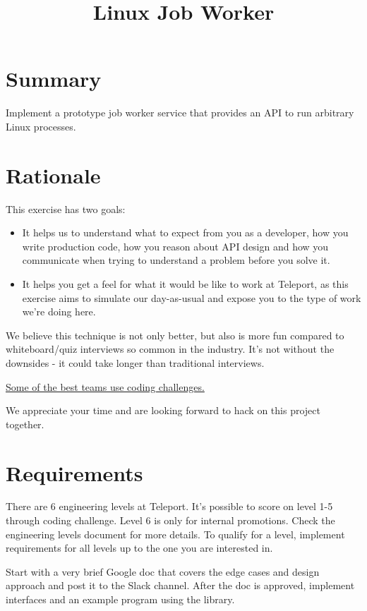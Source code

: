 \documentclass{article}
\begin{document}
 
\title{Linux Job Worker}

\section{Summary}
 
Implement a prototype job worker service that provides an API to run arbitrary Linux processes.

\section{Rationale}
 
    This exercise has two goals:

    \begin{itemize} %
      \item It helps us to understand what to expect from you as a developer, how you write production code, how you reason about API design and how you communicate when trying to understand a problem before you solve it.
      \item It helps you get a feel for what it would be like to work at Teleport, as this exercise aims to simulate our day-as-usual and expose you to the type of work we're doing here.
    \end{itemize}

    We believe this technique is not only better, but also is more fun compared to whiteboard/quiz interviews so common in the industry.  It's not without the downsides - it could take longer than traditional interviews.

    \par

    \href{https://sockpuppet.org/blog/2015/03/06/the-hiring-post/}{Some of the best teams use coding challenges.}

    We appreciate your time and are looking forward to hack on this project together.

\section{Requirements} 

  There are 6 engineering levels at Teleport. It's possible to score on level 1-5 through coding challenge.
  Level 6 is only for internal promotions. Check the engineering levels document for more details.
  To qualify for a level, implement requirements for all levels up to the one you are interested in.

  Start with a very brief Google doc that covers the edge cases and design approach and post it to the Slack channel. After the doc is approved, implement interfaces and an example program using the library.
\end{document}
